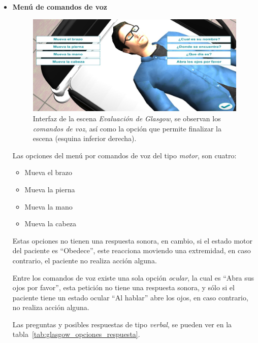 \begin{itemize}
\item{\textbf{Menú de comandos de voz}}

\begin{figure}[hbt]
\centering
\includegraphics[scale=0.5]{solucion/images/glasgow_comandos_voz.jpg}
\caption{Interfaz de la escena \emph{Evaluación de Glasgow}, se observan los
    \emph{comandos de voz}, así como la opción que permite finalizar la escena
    (esquina inferior derecha).}
\label{fig:glasgow_gui}
\end{figure}

Las opciones del menú por comandos de voz del tipo \emph{motor}, son cuatro: 

\begin{itemize}
    \item Mueva el brazo
    \item Mueva la pierna
    \item Mueva la mano
    \item Mueva la cabeza
\end{itemize}

Estas opciones no tienen una respuesta sonora, en cambio, si el estado motor del paciente es
\enquote{Obedece}, este reacciona moviendo una extremidad, en caso
contrario, el paciente no realiza acción alguna.

Entre los comandos de voz existe una sola opción \emph{ocular}, la cual es 
\enquote{Abra sus ojos por
favor}, esta petición no tiene una respuesta sonora, y sólo si el paciente tiene un
estado ocular \enquote{Al hablar} abre los ojos, en caso contrario, no realiza
acción alguna.

Las preguntas y posibles respuestas de tipo \emph{verbal}, se pueden ver en la
tabla~\ref{tab:glasgow_opciones_respuesta}. 


\end{itemize}
